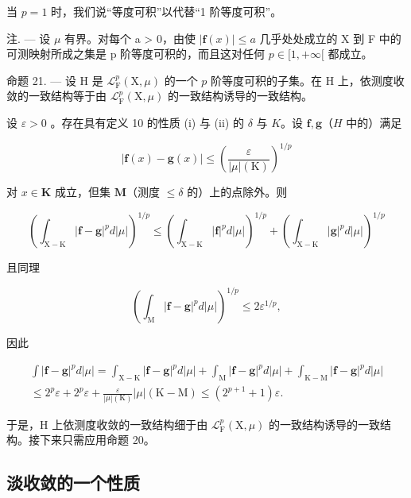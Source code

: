 当 \(p = 1\) 时，我们说“等度可积”以代替“1 阶等度可积”。

注. --- 设 \(\mu\) 有界。对每个 a \textgreater{} 0，由使 \(|\mathbf{f}(x)| \leqslant a\) 几乎处处成立的 X 到 F 中的可测映射所成之集是 p 阶等度可积的，而且这对任何 \(p \in [1, +\infty[\) 都成立。

命题 21. --- 设 H 是 \(\mathcal{L}_{\mathrm{F}}^{p}(\mathrm{X},\mu)\) 的一个 \(p\) 阶等度可积的子集。在 H 上，依测度收敛的一致结构等于由 \(\mathcal{L}_{\mathrm{F}}^{p}(\mathrm{X},\mu)\) 的一致结构诱导的一致结构。

设 \(\varepsilon > 0\) 。存在具有定义 10 的性质 (i) 与 (ii) 的 \(\delta\) 与 \(K\)。设 \(\mathbf{f}, \mathbf{g}\)（\(H\) 中的）满足

\[
| \mathbf {f} (x) - \mathbf {g} (x) | \leqslant \left(\frac {\varepsilon}{| \mu | (\mathrm{K})}\right) ^ {1 / p}
\]

对 \(x \in \mathbf{K}\) 成立，但集 \(\mathbf{M}\)（测度 \(\leqslant \delta\) 的）上的点除外。则

\[
\left(\int_ {\mathrm{X} - \mathrm{K}} | \mathbf {f} - \mathbf {g} | ^ {p} d | \mu |\right) ^ {1 / p} \leqslant \left(\int_ {\mathrm{X} - \mathrm{K}} | \mathbf {f} | ^ {p} d | \mu |\right) ^ {1 / p} + \left(\int_ {\mathrm{X} - \mathrm{K}} | \mathbf {g} | ^ {p} d | \mu |\right) ^ {1 / p}
\]

且同理

\[
\left(\int_ {\mathrm{M}} | \mathbf {f} - \mathbf {g} | ^ {p} d | \mu |\right) ^ {1 / p} \leqslant 2 \varepsilon^ {1 / p},
\]

因此

\[
\begin{array}{c} \int | \mathbf {f} - \mathbf {g} | ^ {p} d | \mu | = \int_ {\mathrm{X-K}} | \mathbf {f} - \mathbf {g} | ^ {p} d | \mu | + \int_ {\mathrm{M}} | \mathbf {f} - \mathbf {g} | ^ {p} d | \mu | + \int_ {\mathrm{K-M}} | \mathbf {f} - \mathbf {g} | ^ {p} d | \mu | \\ \leqslant 2 ^ {p} \varepsilon + 2 ^ {p} \varepsilon + \frac {\varepsilon}{| \mu | (\mathrm{K})} | \mu | (\mathrm{K-M}) \leqslant (2 ^ {p + 1} + 1) \varepsilon . \end{array}
\]

于是，H 上依测度收敛的一致结构细于由 \(\mathcal{L}_{\mathrm{F}}^{p}(\mathrm{X},\mu)\) 的一致结构诱导的一致结构。接下来只需应用命题 20。

\subsection{淡收敛的一个性质}

